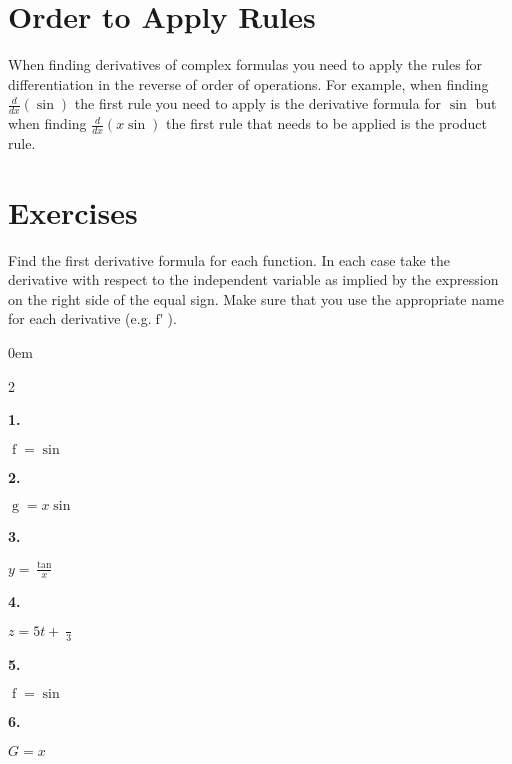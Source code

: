 \documentclass[12pt,]{book}
\theoremstyle{plain}
\theoremstyle{definition}
\numberwithin{equation}{section}
\newenvironment{exercisegroup}%
{\medskip\noindent}%
{\par\bigskip}%
\newlength{\exercisegroupindent}%
\newlength{\exercisegroupitemwidth}%
\newenvironment{exercisegrouplist}%
{\vspace{-\partopsep}%
\begin{adjustwidth}{\exercisegroupindent}{0em}}%
{\end{adjustwidth}%
\vspace{-\partopsep}%
\vspace{\baselineskip}}%
\newenvironment{exercisegroupbycol}[1]%
{\begin{exercisegrouplist}%
\vspace{-\multicolsep}%
\begin{multicols}{#1}%
\setlength{\parindent}{0em}%
\setlength{\exercisegroupitemwidth}{\linewidth}}%
{\end{multicols}%
\vspace{-\multicolsep}%
\end{exercisegrouplist}}%
\newenvironment{exercisegroupitem}[1]%
{\begin{minipage}[t]{\exercisegroupitemwidth}
\vspace{0pt}%
{\bfseries#1}%
\rule{0pt}{\baselineskip}}{\strut%
\end{minipage}%
\hspace{\columnsep}}%
\providecommand\phantomsection{}
\newcommand{\fe}[2]{\mathop{{#1}{\left(#2\right)}}}
\newcommand{\fd}[1]{#1'}
\newcommand{\lzoo}[2]{{\frac{d}{d#1}}{\left(#2\right)}}
\begin{document}
\section[Order to Apply Rules]{Order to Apply Rules}\label{section-order-to-apply-rules}
When finding derivatives of complex formulas you need to apply the rules for differentiation in the reverse of order of operations.  For example, when finding \(\lzoo{x}{\fe{\sin}{x\,e^x}}\) the first rule you need to apply is the derivative formula for \(\fe{\sin}{u}\) but when finding \(\lzoo{x}{x\fe{\sin}{e^x}}\) the first rule that needs to be applied is the product rule.%
\typeout{************************************************}
\typeout{************************************************}
\section*{Exercises}\label{exercises-41}

\begin{exercisegroup}%
Find the first derivative formula for each function.  In each case take the derivative with respect to the independent variable as implied by the expression on the right side of the equal sign.  Make sure that you use the appropriate name for each derivative (e.g.\@ \(\fe{\fd{f}}{x}\)).%
\par
\begin{exercisegroupbycol}{2}%
\begin{exercisegroupitem}{1. }\phantomsection\hypertarget{exercise-351}{\null}
\(\fe{f}{x}=\fe{\sin}{x\,e^x}\)%
\end{exercisegroupitem}%
\par%
\begin{exercisegroupitem}{2. }\phantomsection\hypertarget{exercise-352}{\null}
\(\fe{g}{x}=x\fe{\sin}{e^x}\)%
\end{exercisegroupitem}%
\par%
\begin{exercisegroupitem}{3. }\phantomsection\hypertarget{exercise-353}{\null}
\(y=\frac{\fe{\tan}{\fe{\ln}{x}}}{x}\)%
\end{exercisegroupitem}%
\par%
\begin{exercisegroupitem}{4. }\phantomsection\hypertarget{exercise-354}{\null}
\(z=5t+\frac{\fe{\cos^2}{t^2}}{3}\)%
\end{exercisegroupitem}%
\par%
\begin{exercisegroupitem}{5. }\phantomsection\hypertarget{exercise-355}{\null}
\(\fe{f}{y}=\fe{\sin}{\frac{\fe{\ln}{y}}{y}}\)%
\end{exercisegroupitem}%
\par%
\begin{exercisegroupitem}{6. }\phantomsection\hypertarget{exercise-356}{\null}
\(G=x\fe{\sin^{-1}}{x\fe{\ln}{x}}\)%
\end{exercisegroupitem}%
\par%
\end{exercisegroupbycol}%
\end{exercisegroup}%
\typeout{************************************************}
\typeout{************************************************}
\end{document}
